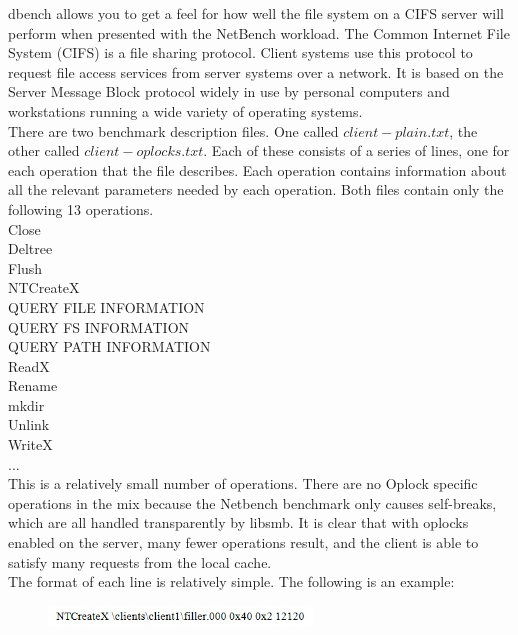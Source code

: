 \documentclass[10pt, conference]{IEEEtran}
\begin{document}
\indent dbench allows you to get a feel for how well the file system on a CIFS server will perform when presented with the NetBench workload. The Common Internet File System (CIFS) is a file sharing protocol. Client systems use this protocol to request file access services from server systems over a network. It is based on the Server Message Block protocol widely in use by personal computers and workstations running a wide variety of operating systems. \\
\indent There are two benchmark description files. One called $client-plain.txt$, the other called $client-oplocks.txt$.  Each of these consists of a series of lines, one for each operation that the file describes. Each operation contains information about all the relevant parameters needed by each operation. Both files contain only the following 13 operations.\\

\indent Close\\
\indent Deltree\\
\indent Flush\\
\indent NTCreateX\\
\indent QUERY FILE INFORMATION\\
\indent QUERY FS INFORMATION\\
\indent QUERY PATH INFORMATION\\
\indent ReadX\\
\indent Rename\\
\indent mkdir\\
\indent Unlink\\
\indent WriteX\\
\indent ...\\

\indent This is a relatively small number of operations. There are no Oplock specific operations in the mix because the Netbench benchmark only causes self-breaks, which are all handled transparently by libsmb. It is clear that with oplocks enabled on the server, many fewer operations result, and the client is able to satisfy many requests from the local cache.\\
\indent The format of each line is relatively simple. The following is an example: 

\begin{figure}[h!]
	\centering
	\includegraphics[width=7cm]{figure1.jpg}
\end{figure} 
\end{document}
